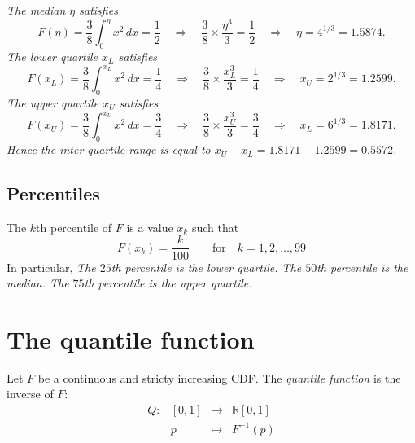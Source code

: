 \begin{solution}
\ben
\it %
The median $\eta$ satisfies
\[
F(\eta) = \frac{3}{8}\int_0^{\eta} x^2\,dx = \frac{1}{2}
\quad\Rightarrow\quad
\frac{3}{8}\times\frac{\eta^3}{3} = \frac{1}{2}
\quad\Rightarrow\quad
\eta = 4^{1/3} = 1.5874.
\]
\it %
The lower quartile $x_L$ satisfies
\[
F(x_L) = \frac{3}{8}\int_0^{x_L} x^2\,dx = \frac{1}{4}
\quad\Rightarrow\quad
\frac{3}{8}\times\frac{x_L^3}{3} = \frac{1}{4}
\quad\Rightarrow\quad
x_U = 2^{1/3} = 1.2599.
\]
The upper quartile $x_U$ satisfies
\[
F(x_U) = \frac{3}{8}\int_0^{x_U} x^2\,dx = \frac{3}{4}
\quad\Rightarrow\quad
\frac{3}{8}\times\frac{x_U^3}{3} = \frac{3}{4}
\quad\Rightarrow\quad
x_L = 6^{1/3} = 1.8171.
\]
Hence the inter-quartile range is equal to $x_U-x_L = 1.8171 - 1.2599 = 0.5572$.
\een
\end{solution}

\subsection{Percentiles}
\begin{definition}
The $k$th percentile of $F$ is a value $x_k$ such that
\[
F(x_k) = \frac{k}{100} \qquad\text{for}\quad k=1,2,\ldots,99
\]
In particular, 
\bit
\it The $25$th percentile is the lower quartile.
\it The $50$th percentile is the median.
\it The $75$th percentile is the upper quartile.
\eit
\end{definition}


\section{The quantile function}

\begin{definition}
Let $F$ be a continuous and stricty increasing CDF.
The \emph{quantile function} is the inverse of $F$:
\[
\begin{array}{cccl}
Q:	& [0,1]	& \longrightarrow	& \mathbb{R}	 [0,1] \\
	& p 		& \mapsto			& F^{-1}(p) 
\end{array}
\]
\end{definition}

